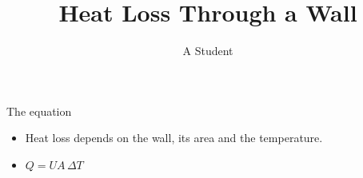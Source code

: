 \documentclass[aspectratio=169]{beamer}
\title{Heat Loss Through a Wall}
\author{A Student}
\begin{document}
\begin{frame}
  \titlepage
\end{frame}
\begin{frame}{The equation}
  \begin{itemize}
    \item<1-> Heat loss depends on the wall, its area and the temperature.
    \item<2-> $Q = U A \, \Delta T$
  \end{itemize}
\end{frame}
\end{document}
